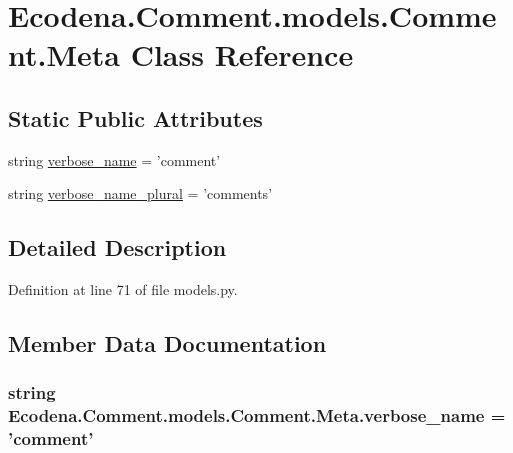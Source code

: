 \hypertarget{class_ecodena_1_1_comment_1_1models_1_1_comment_1_1_meta}{
\section{Ecodena.Comment.models.Comment.Meta Class Reference}
\label{d4/d24/class_ecodena_1_1_comment_1_1models_1_1_comment_1_1_meta}
}
\subsection*{Static Public Attributes}
\begin{DoxyCompactItemize}
\item 
string \hyperlink{class_ecodena_1_1_comment_1_1models_1_1_comment_1_1_meta_a20eda28cd22d10df2c33831253f926ee}{verbose\_\-name} = 'comment'
\item 
string \hyperlink{class_ecodena_1_1_comment_1_1models_1_1_comment_1_1_meta_ab47cb8c6b3591a60ce7470138312f77a}{verbose\_\-name\_\-plural} = 'comments'
\end{DoxyCompactItemize}


\subsection{Detailed Description}


Definition at line 71 of file models.py.



\subsection{Member Data Documentation}
\hypertarget{class_ecodena_1_1_comment_1_1models_1_1_comment_1_1_meta_a20eda28cd22d10df2c33831253f926ee}{
\subsubsection[{verbose\_\-name}]{\setlength{\rightskip}{0pt plus 5cm}string {\bf Ecodena.Comment.models.Comment.Meta.verbose\_\-name} = 'comment'}}
\label{d4/d24/class_ecodena_1_1_comment_1_1models_1_1_comment_1_1_meta_a20eda28cd22d10df2c33831253f926ee}



